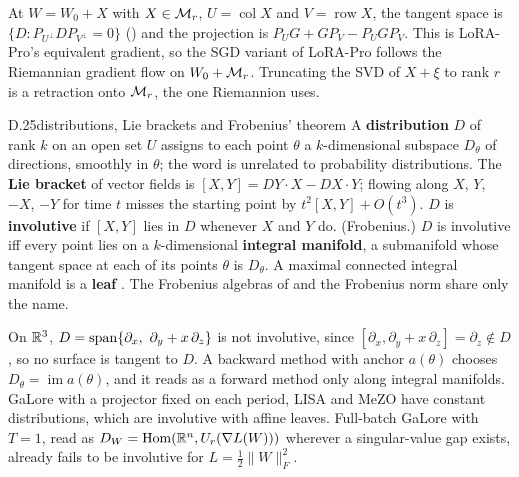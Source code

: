 At $W=W_0+X$ with $X\in\mathcal{M}_r$, $U=\operatorname{col}X$ and $V=\operatorname{row}X$, the tangent space is
$\{D:P_{U^\perp}DP_{V^\perp}=0\}$ () and the projection is $P_UG+GP_V-P_UGP_V$. This is LoRA-Pro's
equivalent gradient, so the SGD variant of LoRA-Pro follows the Riemannian gradient flow on $W_0+\mathcal{M}_r$. Truncating the
SVD of $X+\xi$ to rank $r$ is a retraction onto $\mathcal{M}_r$, the one Riemannion \citep{bogachev2025lora} uses.


\begin{bgfact}{D.25}{distributions, Lie brackets and Frobenius' theorem}
A \textbf{distribution} $D$ of rank $k$ on an open set $U$ assigns to each point $\theta$ a $k$-dimensional subspace
$D_\theta$ of directions, smoothly in $\theta$; the word is unrelated to probability distributions. The \textbf{Lie
bracket} of vector fields is $[X,Y]=DY\cdot X-DX\cdot Y$; flowing along $X$, $Y$, $-X$, $-Y$ for time $t$ misses the
starting point by $t^2[X,Y]+O(t^3)$. $D$ is \textbf{involutive} if $[X,Y]$ lies in $D$ whenever $X$ and $Y$ do.
(Frobenius.) $D$ is involutive iff every point lies on a $k$-dimensional \textbf{integral manifold}, a submanifold whose
tangent space at each of its points $\theta$ is $D_\theta$. A maximal connected integral manifold is a \textbf{leaf}
\citep[Ch.~19]{xlee2013introduction}. The Frobenius algebras of  and the Frobenius norm share only the name.
\end{bgfact}

On $\mathbb{R}^3$, $D=\spanop\{\partial_x,\ \partial_y+x\,\partial_z\}$ is not involutive, since
$[\partial_x,\partial_y+x\,\partial_z]=\partial_z\notin D$, so no surface is tangent to $D$. A backward method with
anchor $a(\theta)$ chooses $D_\theta=\operatorname{im}a(\theta)$, and it reads as a forward method only along integral
manifolds. GaLore \citep{zhao2024galore} with a projector fixed on each period, LISA \citep{pan2024lisa} and MeZO
\citep{malladi2023fine} have constant distributions, which are involutive with affine leaves. Full-batch GaLore with
$T=1$, read as $D_W=\operatorname{Hom}(\mathbb{R}^n,U_r(\nabla L(W)))$ wherever a singular-value gap exists, already fails to be
involutive for $L=\tfrac12\|W\|_F^2$.


